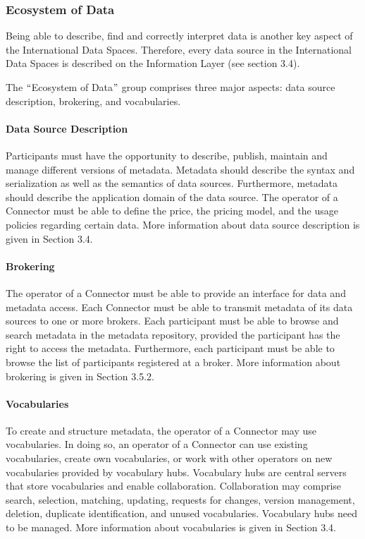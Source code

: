 \subsubsection{Ecosystem of Data}
Being able to describe, find and correctly interpret data is another key aspect of the International Data Spaces. Therefore, every data source in the International Data Spaces is described on the Information Layer (see section 3.4). %

The $``$Ecosystem of Data$"$  group comprises three major aspects: data source description, brokering, and vocabularies.


\paragraph{Data Source Description\\}
Participants must have the opportunity to describe, publish, maintain and manage different versions of metadata. Metadata should describe the syntax and serialization as well as the semantics of data sources. Furthermore, metadata should describe the application domain of the data source. The operator of a Connector must be able to define the price, the pricing model, and the usage policies regarding certain data. More information about data source description is given in Section 3.4. %


\paragraph{Brokering\\}
The operator of a Connector must be able to provide an interface for data and metadata access. Each Connector must be able to transmit metadata of its data sources to one or more brokers. Each participant must be able to browse and search metadata in the metadata repository, provided the participant has the right to access the metadata. Furthermore, each participant must be able to browse the list of participants registered at a broker. More information about brokering is given in Section 3.5.2. %


\paragraph{Vocabularies\\}
To create and structure metadata, the operator of a Connector may use vocabularies. In doing so, an operator of a Connector can use existing vocabularies, create own vocabularies, or work with other operators on new vocabularies provided by vocabulary hubs. Vocabulary hubs are central servers that store vocabularies and enable collaboration. Collaboration may comprise search, selection, matching, updating, requests for changes, version management, deletion, duplicate identification, and unused vocabularies. Vocabulary hubs need to be managed. More information about vocabularies is given in Section 3.4.%


